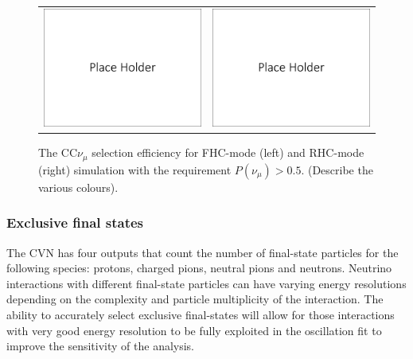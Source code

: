 \begin{figure}
    \centering
    \begin{tabular}{cc}
		\includegraphics[scale=0.22]{graphics/cvn_placeholder.pdf} &
		\includegraphics[scale=0.22]{graphics/cvn_placeholder.pdf} 
	\end{tabular}
	\caption{The CC$\nu_\mu$ selection efficiency for FHC-mode (left) and RHC-mode (right) simulation with the requirement $P(\nu_\mu) > 0.5$. (Describe the various colours).}
    \label{fig:numueff}
\end{figure}

\subsubsection{Exclusive final states}
The CVN has four outputs that count the number of final-state particles for the following species: protons, charged pions, neutral pions and neutrons. Neutrino interactions with different final-state particles can have varying energy resolutions depending on the complexity and particle multiplicity of the interaction. The ability to accurately select exclusive final-states will allow for those interactions with very good energy resolution to be fully exploited in the oscillation fit to improve the sensitivity of the analysis.

